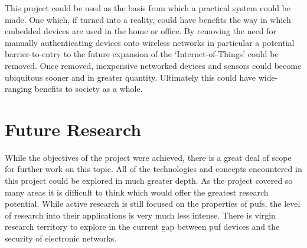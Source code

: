 This project could be used as
the basis from which a practical system could be made.
One which, if turned into a reality, could have benefits
the way in which embedded devices are used in the home or office. By removing
the need for manually authenticating devices onto wireless networks in particular
a potential barrier-to-entry to the future expansion of the `Internet-of-Things'
could be removed. Once removed, inexpensive networked devices and sensors could
become ubiquitous sooner and in greater quantity. Ultimately this could have
wide-ranging benefits to society as a whole.

\section{Future Research}

While the objectives of the project were achieved, there is a great deal of scope
for further work on this topic. All of the technologies and concepts encountered in
this project could be explored in much greater depth. As the project covered so many
areas it is difficult to think which would offer the greatest research
potential. While active research is still focused on the properties
of \glspl{puf}, the level of research into their applications is very much less
intense.
There is virgin research territory to explore in the current gap between
\gls{puf} devices and the security of electronic networks.
